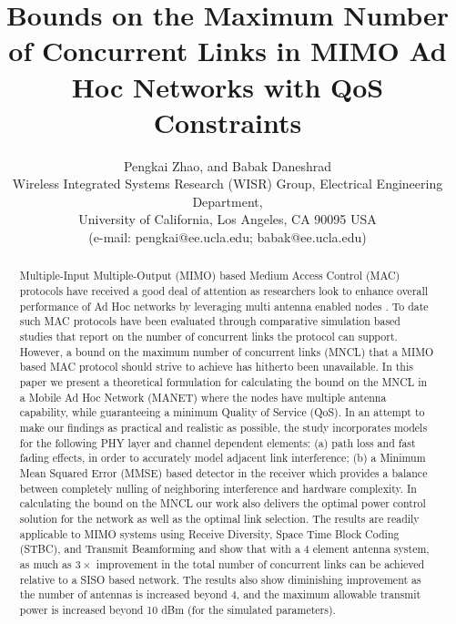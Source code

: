 \documentclass[draftcls,onecolumn,peerview,12pt]{IEEEtran}
\begin{document}
\title{Bounds on the Maximum Number of Concurrent Links in MIMO Ad Hoc
Networks with QoS Constraints}
\author{\normalsize{Pengkai Zhao, and Babak Daneshrad\\
        Wireless Integrated Systems Research (WISR) Group, Electrical Engineering Department,\\
        University of California, Los Angeles, CA 90095 USA\\
        (e-mail: pengkai@ee.ucla.edu; babak@ee.ucla.edu)}}





\maketitle


\begin{abstract}
Multiple-Input Multiple-Output (MIMO) based Medium Access Control
(MAC) protocols have received a good deal of attention as
researchers look to enhance overall performance of Ad Hoc networks
by leveraging multi antenna enabled nodes \cite{1_Fair_MAC,
2_nullhoc, 3_SPACEMAC2005, 4_Adaptive_Interference_Cancellation2005,
5_cross_layer}. To date such MAC protocols have been evaluated
through comparative simulation based studies that report on the
number of concurrent links the protocol can support. However, a
bound on the maximum number of concurrent links (MNCL) that a MIMO
based MAC protocol should strive to achieve has hitherto been
unavailable. In this paper we present a theoretical formulation for
calculating the bound on the MNCL in a Mobile Ad Hoc Network (MANET)
where the nodes have multiple antenna capability, while guaranteeing
a minimum Quality of Service (QoS). In an attempt to make our
findings as practical and realistic as possible, the study
incorporates models for the following PHY layer and channel
dependent elements: (a) path loss and fast fading effects, in order
to accurately model adjacent link interference; (b) a Minimum Mean
Squared Error (MMSE) based detector in the receiver which provides a
balance between completely nulling of neighboring interference and
hardware complexity. In calculating the bound on the MNCL our work
also delivers the optimal power control solution for the network as
well as the optimal link selection. The results are readily
applicable to MIMO systems using Receive Diversity, Space Time Block
Coding (STBC), and Transmit Beamforming and show that with a 4
element antenna system, as much as $3\times$ improvement in the
total number of concurrent links can be achieved relative to a SISO
based network. The results also show diminishing improvement as the
number of antennas is increased beyond 4, and the maximum allowable
transmit power is increased beyond 10 dBm (for the simulated
parameters).
\end{abstract}
\end{document}
